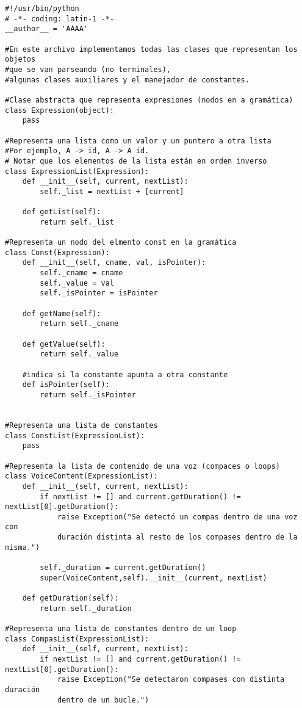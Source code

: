 \begin{verbatim}
#!/usr/bin/python
# -*- coding: latin-1 -*-
__author__ = 'AAAA'

#En este archivo implementamos todas las clases que representan los objetos 
#que se van parseando (no terminales),
#algunas clases auxiliares y el manejador de constantes.

#Clase abstracta que representa expresiones (nodos en a gramática)
class Expression(object):
    pass

#Representa una lista como un valor y un puntero a otra lista
#Por ejemplo, A -> id, A -> A id.
# Notar que los elementos de la lista están en orden inverso
class ExpressionList(Expression):
    def __init__(self, current, nextList):
        self._list = nextList + [current]

    def getList(self):
        return self._list

#Representa un nodo del elmento const en la gramática
class Const(Expression):
    def __init__(self, cname, val, isPointer):
        self._cname = cname
        self._value = val
        self._isPointer = isPointer

    def getName(self):
        return self._cname

    def getValue(self):
        return self._value

    #indica si la constante apunta a otra constante
    def isPointer(self):
        return self._isPointer


#Representa una lista de constantes
class ConstList(ExpressionList):
    pass

#Representa la lista de contenido de una voz (compaces o loops)
class VoiceContent(ExpressionList):
    def __init__(self, current, nextList):
        if nextList != [] and current.getDuration() != nextList[0].getDuration():
            raise Exception("Se detectó un compas dentro de una voz con 
            duración distinta al resto de los compases dentro de la misma.")

        self._duration = current.getDuration()
        super(VoiceContent,self).__init__(current, nextList)

    def getDuration(self):
        return self._duration

#Representa una lista de constantes dentro de un loop
class CompasList(ExpressionList):
    def __init__(self, current, nextList):
        if nextList != [] and current.getDuration() != nextList[0].getDuration():
            raise Exception("Se detectaron compases con distinta duración 
            dentro de un bucle.")


\end{verbatim}
